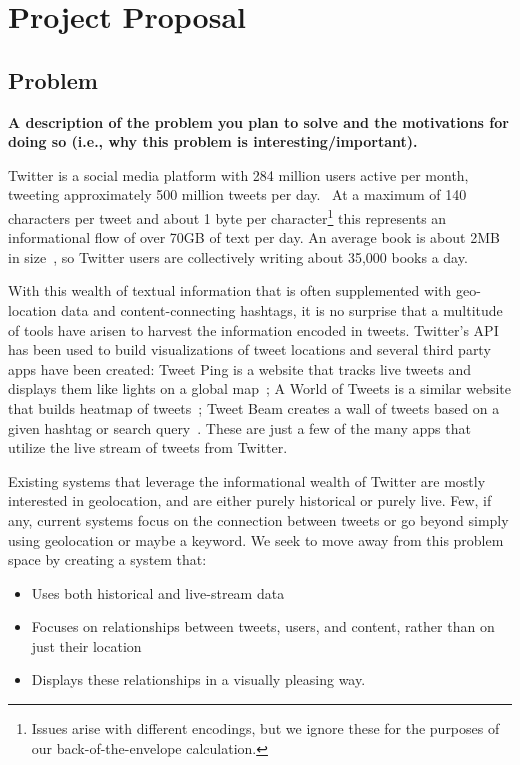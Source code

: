 \section{Project Proposal}

\subsection{Problem}
\textbf{A description of the problem you plan to solve and the motivations for doing so (i.e., why this problem is interesting/important).}

Twitter is a social media platform with 284 million users active per month, tweeting approximately 500 million tweets
per day.~\cite{twitter} At a maximum of 140 characters per tweet and about 1 byte per character\footnote{Issues arise with different
encodings, but we ignore these for the purposes of our back-of-the-envelope calculation.} this represents an informational
flow of over 70GB of text per day. An average book is about 2MB in size~\cite{bookfact}, so Twitter users are collectively
writing about 35,000 books a day.

With this wealth of textual information that is often supplemented with geo-location data and content-connecting hashtags,
it is no surprise that a multitude of tools have arisen to harvest the information encoded in tweets. Twitter's
API~\cite{twitterAPI} has been used to build visualizations of tweet locations and several third party apps
have been created: Tweet Ping is a website that tracks live tweets and displays them like lights on a global
map~\cite{tweetping1, tweetping2}; A World of Tweets is a similar website that builds  heatmap of tweets~\cite{worldoftweets}; Tweet Beam
creates a wall of tweets based on a given hashtag or search query~\cite{tweetbeam}. These are just a few of the many apps that
utilize the live stream of tweets from Twitter.

Existing systems that leverage the informational wealth of Twitter are mostly interested in geolocation, and are either
purely historical or purely live. Few, if any, current systems focus on the connection between tweets or go beyond
simply using geolocation or maybe a keyword. We seek to move away from this problem space by creating a system that:
\begin{itemize}[noitemsep]
\item Uses both historical and live-stream data
\item Focuses on relationships between tweets, users, and content, rather than on just their location
\item Displays these relationships in a visually pleasing way.
\end{itemize}

